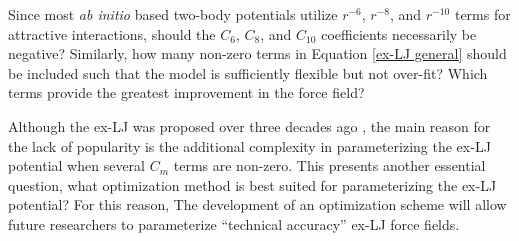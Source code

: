 \documentclass[12pt,a4paper]{article}
\begin{document}
%


Since most \textit{ab initio} based two-body potentials utilize $r^{-6}$, $r^{-8}$, and $r^{-10}$ terms for attractive interactions, should the $C_6$, $C_8$, and $C_{10}$ coefficients necessarily be negative? Similarly, how many non-zero terms in Equation \ref{ex-LJ general} should be included such that the model is sufficiently flexible but not over-fit? Which terms provide the greatest improvement in the force field? 




Although the ex-LJ was proposed over three decades ago \cite{Kalos1972}, the main reason for the lack of popularity is the additional complexity in parameterizing the ex-LJ potential when several $C_m$ terms are non-zero. This presents another essential question, what optimization method is best suited for parameterizing the ex-LJ potential?  For this reason,  The development of an optimization scheme will allow future researchers to parameterize ``technical accuracy'' ex-LJ force fields.
\end{document}
